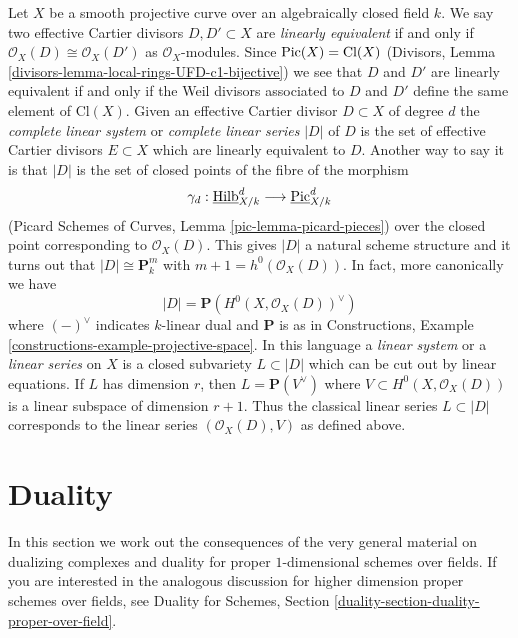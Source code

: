 \begin{remark}
\label{remark-classical-linear-series}
Let $X$ be a smooth projective curve over an algebraically closed field $k$.
We say two effective Cartier divisors $D, D' \subset X$ are
{\it linearly equivalent} if and only if
$\mathcal{O}_X(D) \cong \mathcal{O}_X(D')$ as $\mathcal{O}_X$-modules.
Since $\mathop{\mathrm{Pic}}\nolimits(X) = \text{Cl}(X)$
(Divisors, Lemma \ref{divisors-lemma-local-rings-UFD-c1-bijective})
we see that $D$ and $D'$ are linearly equivalent
if and only if the Weil divisors associated to
$D$ and $D'$ define the same element of $\text{Cl}(X)$.
Given an effective Cartier divisor $D \subset X$ of degree $d$ the
{\it complete linear system} or {\it complete linear series} $|D|$ of $D$
is the set of effective Cartier divisors $E \subset X$
which are linearly equivalent to $D$.
Another way to say it is that $|D|$ is the set of closed
points of the fibre of the morphism
$$
\gamma_d :
\underline{\mathrm{Hilb}}^d_{X/k}
\longrightarrow
\underline{\mathrm{Pic}}^d_{X/k}
$$
(Picard Schemes of Curves, Lemma \ref{pic-lemma-picard-pieces})
over the closed point corresponding to $\mathcal{O}_X(D)$.
This gives $|D|$ a natural scheme structure and it
turns out that $|D| \cong \mathbf{P}^m_k$ with
$m + 1 = h^0(\mathcal{O}_X(D))$. In fact, more canonically we have
$$
|D| = \mathbf{P}(H^0(X, \mathcal{O}_X(D))^\vee)
$$
where $(-)^\vee$ indicates $k$-linear dual and $\mathbf{P}$ is as
in Constructions, Example \ref{constructions-example-projective-space}.
In this language a {\it linear system} or a {\it linear series} on
$X$ is a closed subvariety $L \subset |D|$ which can be cut out by
linear equations. If $L$ has dimension $r$, then $L = \mathbf{P}(V^\vee)$
where $V \subset H^0(X, \mathcal{O}_X(D))$ is a linear subspace
of dimension $r + 1$. Thus the classical linear series
$L \subset |D|$ corresponds to the linear series $(\mathcal{O}_X(D), V)$
as defined above.
\end{remark}







\section{Duality}
\label{section-duality}

\noindent
In this section we work out the consequences of the very general
material on dualizing complexes and duality for proper $1$-dimensional
schemes over fields. If you are interested in the analogous discussion
for higher dimension proper schemes over fields, see
Duality for Schemes, Section \ref{duality-section-duality-proper-over-field}.

